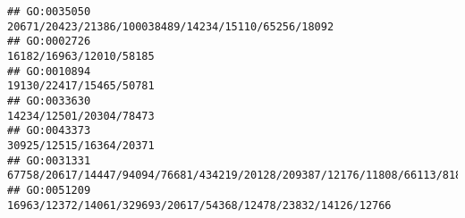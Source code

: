 \documentclass[
]{article}
\begin{document}
\begin{verbatim}
## GO:0035050                                                                                                                                                                                                                                                                                                                                                          20671/20423/21386/100038489/14234/15110/65256/18092
## GO:0002726                                                                                                                                                                                                                                                                                                                                                                                      16182/16963/12010/58185
## GO:0010894                                                                                                                                                                                                                                                                                                                                                                                      19130/22417/15465/50781
## GO:0033630                                                                                                                                                                                                                                                                                                                                                                                      14234/12501/20304/78473
## GO:0043373                                                                                                                                                                                                                                                                                                                                                                                      30925/12515/16364/20371
## GO:0031331                                                                                                                                                                                                                                                                                                                  67758/20617/14447/94094/76681/434219/20128/209387/12176/11808/66113/81897/76815/54483/11551
## GO:0051209                                                                                                                                                                                                                                                                                                                                                 16963/12372/14061/329693/20617/54368/12478/23832/14126/12766

\end{verbatim}
\end{document}
